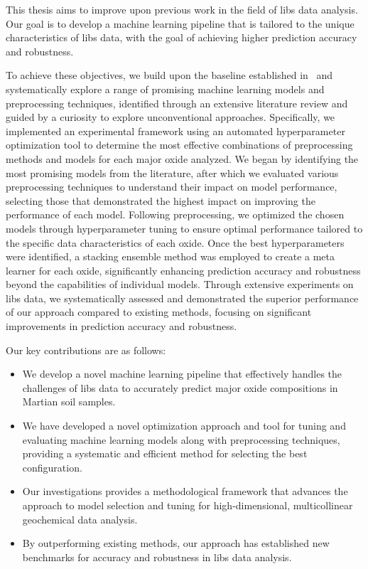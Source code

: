 This thesis aims to improve upon previous work in the field of \gls{libs} data analysis.
Our goal is to develop a machine learning pipeline that is tailored to the unique characteristics of \gls{libs} data, with the goal of achieving higher prediction accuracy and robustness.

To achieve these objectives, we build upon the baseline established in~\citet{p9_paper} and systematically explore a range of promising machine learning models and preprocessing techniques, identified through an extensive literature review and guided by a curiosity to explore unconventional approaches.
Specifically, we implemented an experimental framework using an automated hyperparameter optimization tool to determine the most effective combinations of preprocessing methods and models for each major oxide analyzed.
We began by identifying the most promising models from the literature, after which we evaluated various preprocessing techniques to understand their impact on model performance, selecting those that demonstrated the highest impact on improving the performance of each model.
Following preprocessing, we optimized the chosen models through hyperparameter tuning to ensure optimal performance tailored to the specific data characteristics of each oxide.
Once the best hyperparameters were identified, a stacking ensemble method was employed to create a meta learner for each oxide, significantly enhancing prediction accuracy and robustness beyond the capabilities of individual models.
Through extensive experiments on \gls{libs} data, we systematically assessed and demonstrated the superior performance of our approach compared to existing methods, focusing on significant improvements in prediction accuracy and robustness.

Our key contributions are as follows:
\begin{itemize}
    \item We develop a novel machine learning pipeline that effectively handles the challenges of \gls{libs} data to accurately predict major oxide compositions in Martian soil samples.
    \item We have developed a novel optimization approach and tool for tuning and evaluating machine learning models along with preprocessing techniques, providing a systematic and efficient method for selecting the best configuration.
    \item Our investigations provides a methodological framework that advances the approach to model selection and tuning for high-dimensional, multicollinear geochemical data analysis.
    \item By outperforming existing methods, our approach has established new benchmarks for accuracy and robustness in \gls{libs} data analysis.
\end{itemize}


